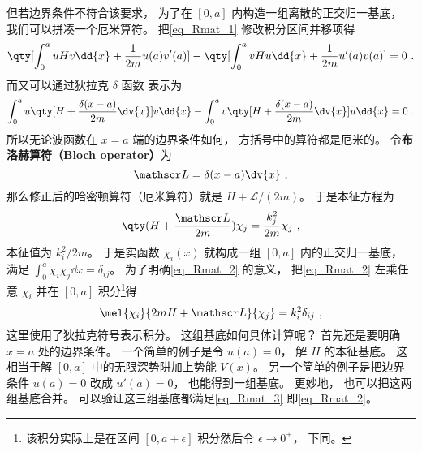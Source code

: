 但若边界条件不符合该要求， 为了在 $[0,a]$ 内构造一组离散的正交归一基底， 我们可以拼凑一个厄米算符。 把\autoref{eq_Rmat_1} 修改积分区间并移项得
\begin{equation}
\qty[\int_{0}^{a} uHv\dd{x} + \frac{1}{2m}u(a)v'(a)] - \qty[\int_{0}^{a} vHu\dd{x} + \frac{1}{2m}u'(a)v(a)]
= 0~.
\end{equation}
而又可以通过狄拉克 $\delta$ 函数 表示为
\begin{equation}
\int_{0}^{a} u\qty[H + \frac{\delta(x-a)}{2m}\dv{x}] v\dd{x} -
\int_{0}^{a} v\qty[H + \frac{\delta(x-a)}{2m}\dv{x}] u\dd{x} = 0~.
\end{equation}
所以无论波函数在 $x=a$ 端的边界条件如何， 方括号中的算符都是厄米的。 令\textbf{布洛赫算符（Bloch operator）}为
\begin{equation}\label{eq_Rmat_6}
\mathscr L = \delta(x-a)\dv{x}~,
\end{equation}
那么修正后的哈密顿算符（厄米算符）就是 $H + \mathscr L/(2m)$。 于是本征方程为
\begin{equation}\label{eq_Rmat_2}
\qty(H + \frac{\mathscr L}{2m})\chi_j = \frac{k_j^2}{2m} \chi_j~,
\end{equation}
本征值为 ${k_i^2}/{2m}$。 于是实函数 $\chi_i(x)$ 就构成一组 $[0, a]$ 内的正交归一基底， 满足 $\int_0^a \chi_i \chi_j \dd{x} = \delta_{ij}$。 为了明确\autoref{eq_Rmat_2} 的意义， 把\autoref{eq_Rmat_2} 左乘任意 $\chi_i$ 并在 $[0,a]$ 积分\footnote{该积分实际上是在区间 $[0,a+\epsilon]$ 积分然后令 $\epsilon\to 0^+$， 下同。}得
\begin{equation}\label{eq_Rmat_3}
\mel{\chi_i}{2mH + \mathscr L}{\chi_j} = k_i^2 \delta_{ij}~,
\end{equation}
这里使用了狄拉克符号表示积分。 这组基底如何具体计算呢？ 首先还是要明确 $x=a$ 处的边界条件。 一个简单的例子是令 $u(a) = 0$， 解 $H$ 的本征基底。 这相当于解 $[0,a]$ 中的无限深势阱加上势能 $V(x)$。 另一个简单的例子是把边界条件 $u(a) = 0$ 改成 $u'(a) = 0$， 也能得到一组基底。 更妙地， 也可以把这两组基底合并。 可以验证这三组基底都满足\autoref{eq_Rmat_3} 即\autoref{eq_Rmat_2}。

